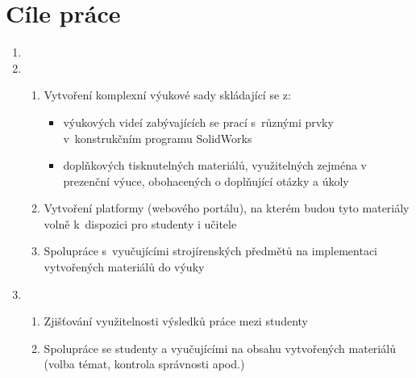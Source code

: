 \chapter{Cíle práce}

\begin{enumerate}[topsep=0pt]
    \setlength\itemsep{0em}
    \item {}
    
    \item {}
    \begin{enumerate}[topsep=0pt]
        \setlength\itemsep{0em}
        \item Vytvoření komplexní výukové sady skládající se z:
        \begin{itemize}
            \item výukových videí zabývajících se prací s~různými prvky v~konstrukčním programu SolidWorks
            \item doplňkových tisknutelných materiálů, využitelných zejména v prezenční výuce, obohacených o doplňující otázky a úkoly 
        \end{itemize}
        \item Vytvoření platformy (webového portálu), na kterém budou tyto materiály volně k~dispozici pro studenty i učitele
        \item Spolupráce s~vyučujícími strojírenských předmětů na implementaci vytvořených materiálů do výuky
    \end{enumerate}

    \item {}
    \begin{enumerate}[topsep=0pt]
        \setlength\itemsep{0em}
        \item Zjišťování využitelnosti výsledků práce mezi studenty 
        \item Spolupráce se studenty a vyučujícími na obsahu vytvořených materiálů (volba témat, kontrola správnosti apod.) 
    \end{enumerate}
\end{enumerate}
